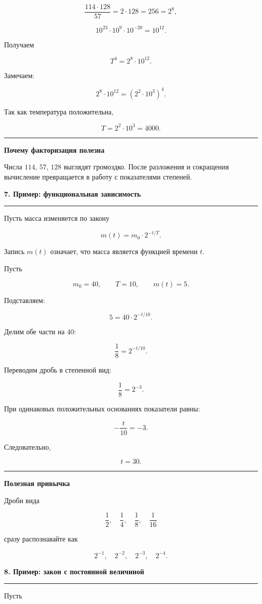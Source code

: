 \documentclass[a4paper,12pt]{article}
\newcommand{\topic}[1]{%
  \vspace{0.5em}
  {\Large\bfseries\color{darkaccent}#1}\par
  \vspace{0.25em}
  {\color{accent}\rule{\linewidth}{0.7pt}}\par
  \vspace{0.6em}
}
\newcommand{\keyidea}[1]{%
  \par\medskip
  {\color{accent}\rule{8mm}{1.2pt}}\quad
  \textbf{#1}
  \par\smallskip
}
\begin{document}
\[
\frac{114\cdot128}{57}
=
2\cdot128
=
256
=
2^8,
\]

\[
10^{23}\cdot10^9\cdot10^{-20}
=
10^{12}.
\]

Получаем

\[
T^4=2^8\cdot10^{12}.
\]

Замечаем:

\[
2^8\cdot10^{12}
=
\left(2^2\cdot10^3\right)^4.
\]

Так как температура положительна,

\[
T=2^2\cdot10^3=4000.
\]

\keyidea{Почему факторизация полезна}

Числа \(114\), \(57\), \(128\) выглядят громоздко.
После разложения и сокращения вычисление превращается в работу
с показателями степеней.

\topic{7. Пример: функциональная зависимость}

Пусть масса изменяется по закону

\[
m(t)=m_0\cdot2^{-t/T}.
\]

Запись \(m(t)\) означает, что масса является функцией времени \(t\).

Пусть

\[
m_0=40,
\qquad
T=10,
\qquad
m(t)=5.
\]

Подставляем:

\[
5=40\cdot2^{-t/10}.
\]

Делим обе части на \(40\):

\[
\frac18=2^{-t/10}.
\]

Переводим дробь в степенной вид:

\[
\frac18=2^{-3}.
\]

При одинаковых положительных основаниях показатели равны:

\[
-\frac{t}{10}=-3.
\]

Следовательно,

\[
t=30.
\]

\keyidea{Полезная привычка}

Дроби вида

\[
\frac12,\quad
\frac14,\quad
\frac18,\quad
\frac1{16}
\]

сразу распознавайте как

\[
2^{-1},\quad
2^{-2},\quad
2^{-3},\quad
2^{-4}.
\]

\topic{8. Пример: закон с постоянной величиной}

Пусть
\end{document}
